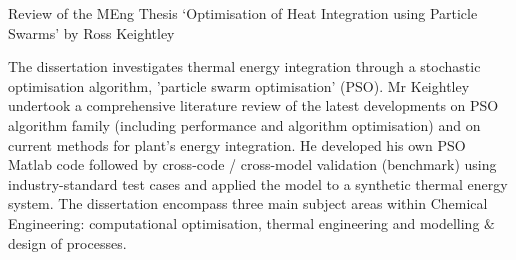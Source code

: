 \documentclass[14pt,twoside]{report}
\begin{document}
\vfill
\clearpage



\bigskip

\begin{center}
  {\Large Review of the MEng Thesis `Optimisation of Heat Integration using Particle Swarms' by Ross Keightley}
\end{center}
The dissertation investigates thermal energy integration through a stochastic optimisation algorithm, 'particle swarm optimisation' (PSO). Mr Keightley undertook a comprehensive literature review of the latest developments on PSO algorithm family (including performance and algorithm optimisation) and on current methods for plant's energy integration. He developed his own PSO Matlab code followed by cross-code / cross-model validation (benchmark) using industry-standard test cases and applied the model to a synthetic thermal energy system. The dissertation encompass three main subject areas within Chemical Engineering: computational optimisation, thermal engineering and modelling $\&$ design of processes.
\end{document}
